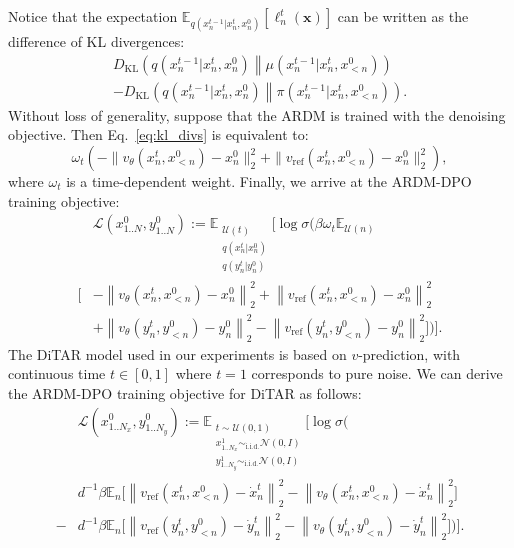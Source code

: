 \documentclass{article}
\begin{document}
Notice that the expectation $\mathbb{E}_{q(x_n^{t - 1} | x_n^t, x_n^0)} [\ell_n^t (\mathbf{x})]$ can be written as the difference of KL divergences:
\begin{equation}
\label{eq:kl_divs}
\begin{aligned}
D_{\mathrm{KL}} \left( q(x_n^{t - 1} | x_n^t, x_n^0) \middle\| \mu(x_n^{t - 1} | x_n^t, x_{<n}^0) \right)\\
- D_{\mathrm{KL}} \left( q(x_n^{t - 1} | x_n^t, x_n^0) \middle\| \pi(x_n^{t - 1} | x_n^t, x_{<n}^0) \right).
\end{aligned}
\end{equation}
Without loss of generality, suppose that the ARDM is trained with the denoising objective. Then Eq.~\eqref{eq:kl_divs} is equivalent to:
\begin{equation}
\omega_t \left(-\|v_\theta(x_n^t, x_{<n}^0) - x_n^0\|_2^2 + \|v_{\mathrm{ref}}(x_n^t, x_{<n}^0) - x_n^0\|_2^2\right),
\end{equation}
where $\omega_t$ is a time-dependent weight. Finally, we arrive at the ARDM-DPO training objective:
\begin{equation}
\label{eq:obj}
\begin{aligned}
& \mathcal L(x_{1..N}^0, y_{1..N}^0) := \mathbb E_{\substack{\mathcal U(t) \\ q(x_n^t | x_n^0) \\ q(y_n^t | y_n^0)}} \Big [\log \sigma \Big (\beta\omega_t \mathbb E_{\mathcal U(n)} \\
\Big [ 
   &- \left \|v_\theta(x_n^t, x_{<n}^0) - x_n^0\right \|_2^2 + \left \|v_{\mathrm{ref}}(x_n^t, x_{<n}^0) - x_n^0\right \|_2^2\\
   &+ \left \|v_\theta(y_n^t, y_{<n}^0) - y_n^0\right \|_2^2 - \left \|v_{\mathrm{ref}}(y_n^t, y_{<n}^0) - y_n^0 \right \|_2^2
\Big ]\Big )\Big ].
\end{aligned}
\end{equation}
The DiTAR model used in our experiments is based on $v$-prediction, with continuous time $t \in [0, 1]$ where $t = 1$ corresponds to pure noise. We can derive the ARDM-DPO training objective for DiTAR as follows:
\begin{equation}
\label{eq:obj_vpred}
\begin{aligned}
& \mathcal L(x_{1..N_x}^0, y_{1..N_y}^0) := \mathbb E_{\substack{t \sim \mathcal U(0, 1) \\ x_{1..N_x}^1 \sim_{\mathrm{i.i.d.}} \mathcal N(0, I) \\ y_{1..N_y}^1 \sim_{\mathrm{i.i.d.}} \mathcal N(0, I)}} \Big [\log \sigma \Big (\\
& d^{-1}\beta \mathbb E_n\Big [ \left \|v_{\mathrm{ref}}(x_n^t, x_{<n}^0) - \dot x_n^t\right \|_2^2 - \left \|v_\theta(x_n^t, x_{<n}^0) - \dot x_n^t\right \|_2^2 \Big ]\\-
&d^{-1}\beta \mathbb E_n\Big [\left \|v_{\mathrm{ref}}(y_n^t, y_{<n}^0) - \dot y_n^t \right \|_2^2 - \left \|v_\theta(y_n^t, y_{<n}^0) - \dot y_n^t\right \|_2^2 
\Big ]\Big )\Big ].
\end{aligned}
\end{equation}
\end{document}
